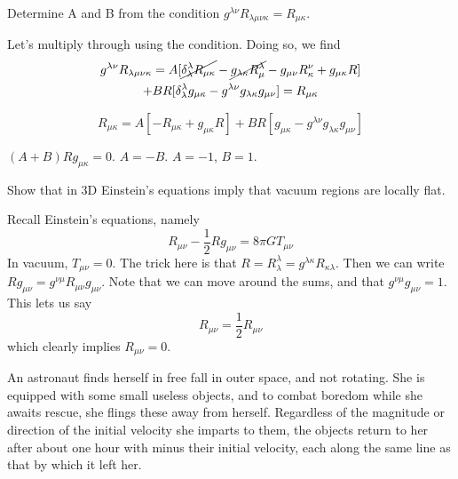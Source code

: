 \documentclass[11pt,largemargins]{homework}
\begin{document}
\begin{alphaparts}
\questionpart
Determine A and B from the condition $g^{\lambda \nu} R_{\lambda \mu \nu \kappa} = R_{\mu \kappa}$.

Let's multiply through using the condition.  Doing so, we find
\begin{multline}
 g^{\lambda \nu} R_{\lambda \mu \nu \kappa} = A[ \cancel{\delta^{\lambda}_{\lambda} R_{\mu \kappa}} - \cancel{g_{\lambda \kappa} R_{\mu}^{\lambda}} - g_{\mu \nu}R_{\kappa}^{\nu} + g_{\mu \kappa} R] \\ 
 + B R [\delta_{\lambda}^{\lambda} g_{\mu \kappa} - g^{\lambda \nu} g_{\lambda \kappa} g_{\mu \nu}] = R_{\mu \kappa}
\end{multline}

$$
R_{\mu \kappa} = A[ - R_{\mu \kappa} + g_{\mu \kappa}R] + BR[g_{\mu \kappa} - g^{\lambda \nu}g_{\lambda \kappa}g_{\mu \nu} ]
$$

$(A+B)R g_{\mu \kappa} = 0$.  $A = -B$.  $A = -1$, $B = 1$.

\questionpart
Show that in 3D Einstein's equations imply that vacuum regions are locally flat.

Recall Einstein's equations, namely
\begin{equation}
R_{\mu \nu} - \frac{1}{2}R g_{\mu \nu} = 8 \pi G T_{\mu \nu}
\end{equation}
In vacuum, $T_{\mu \nu} = 0$. The trick here is that $R = R_{\lambda}^{\lambda} = g^{\lambda \kappa} R_{\kappa \lambda}$.  Then we can write $Rg_{\mu \nu} = g^{\nu \mu}R_{\mu \nu}g_{\mu \nu}$.  Note that we can move around the sums, and that $g^{\nu \mu} g_{\mu \nu} = 1$. This lets us say 
$$ R_{\mu \nu} = \frac{1}{2} R_{\mu \nu} $$ which clearly implies $R_{\mu \nu} = 0$. 
\end{alphaparts}


\question
An astronaut finds herself in free fall in outer space, and not rotating.  She is equipped with some small useless objects, and to combat boredom while she awaits rescue, she flings these away from herself.  Regardless of the magnitude or direction of the initial velocity she imparts to them, the objects return to her after about one hour with minus their initial velocity, each along the same line as that by which it left her.
\end{document}
